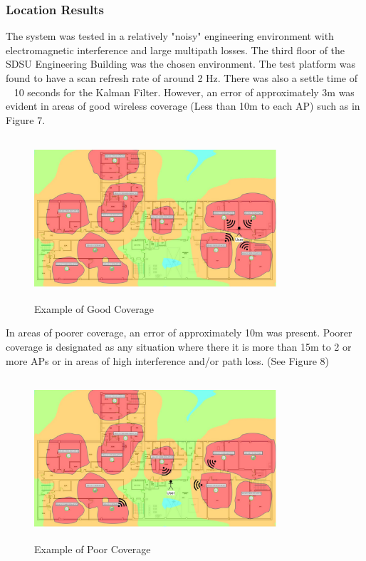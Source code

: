 \documentclass[conference]{IEEEtran}
\begin{document}
\subsubsection{Location Results}
The system was tested in a relatively "noisy" engineering environment with electromagnetic interference and large multipath losses. The third floor of the SDSU Engineering Building was the chosen environment. The test platform was found to have a scan refresh rate of around 2 Hz. There was also a settle time of ~ 10 seconds for the Kalman Filter. However, an error of approximately 3m was evident in areas of good wireless coverage (Less than 10m to each AP) such as in Figure 7.
\begin{figure}[H]
    \includegraphics[width=9.0cm,height=6cm]{Geolocation_1.jpeg}
    \caption{Example of Good Coverage}
    \end{figure}


In areas of poorer coverage, an error of approximately 10m was present. Poorer coverage is designated as any situation where there it is more than 15m to 2 or more APs or in areas of high interference and/or path loss. (See Figure 8)
\begin{figure}[H]
    \includegraphics[width=9.0cm,height=6cm]{Geolocation_2.jpeg}
    \caption{Example of Poor Coverage}
    \end{figure}
\end{document}
